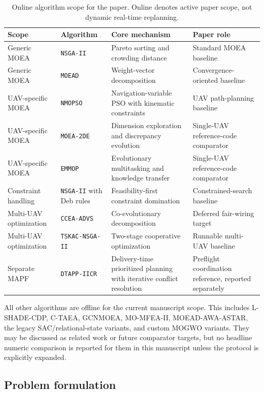 \documentclass[a4paper,fleqn]{cas-dc}
\begin{document}
\begin{table}[t]
\centering
\scriptsize
\caption{Online algorithm scope for the paper. Online denotes active paper scope, not dynamic real-time replanning.}
\label{tab:baseline-online-scope}
\setlength{\tabcolsep}{3pt}
\begin{tabular*}{\textwidth}{@{\extracolsep{\fill}}p{}p{}p{}p{}}
\toprule
Scope & Algorithm & Core mechanism & Paper role \\
\midrule
Generic MOEA & \texttt{NSGA-II} & Pareto sorting and crowding distance & Standard MOEA baseline \\
Generic MOEA & \texttt{MOEAD} & Weight-vector decomposition & Convergence-oriented baseline \\
UAV-specific MOEA & \texttt{NMOPSO} & Navigation-variable PSO with kinematic constraints & UAV path-planning baseline \\
UAV-specific MOEA & \texttt{MOEA-2DE} & Dimension exploration and discrepancy evolution & Single-UAV reference-code comparator \\
UAV-specific MOEA & \texttt{EMMOP} & Evolutionary multitasking and knowledge transfer & Single-UAV reference-code comparator \\
Constraint handling & \texttt{NSGA-II} with Deb rules & Feasibility-first constraint domination & Constrained-search baseline \\
Multi-UAV optimization & \texttt{CCEA-ADVS} & Co-evolutionary decomposition & Deferred fair-wiring target \\
Multi-UAV optimization & \texttt{TSKAC-NSGA-II} & Two-stage cooperative optimization & Runnable multi-UAV baseline \\
Separate MAPF & \texttt{DTAPP-IICR} & Delivery-time prioritized planning with iterative conflict resolution & Preflight coordination reference, reported separately \\
\bottomrule
\end{tabular*}
\end{table}

All other algorithms are offline for the current manuscript scope. This includes L-SHADE-CDP, C-TAEA, GCNMOEA, MO-MFEA-II, MOEAD-AWA-ASTAR, the legacy SAC/relational-state variants, and custom MOGWO variants. They may be discussed as related work or future comparator targets, but no headline numeric comparison is reported for them in this manuscript unless the protocol is explicitly expanded.

\subsection{Problem formulation}
\label{sec:problem}
\end{document}
